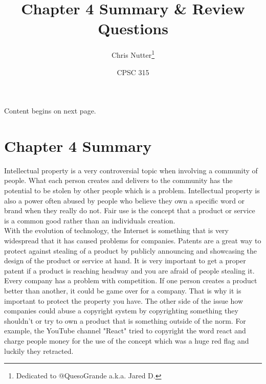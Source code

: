 \documentclass[12pt]{article}
\title{Chapter 4 Summary \& Review Questions}
\author{Chris Nutter\thanks{Dedicated to @QuesoGrande a.k.a. Jared D.}}
\date{CPSC 315}
\begin{document}
\maketitle

\normalsize

\tableofcontents    
\vspace{4ex}

\begin{center} Content begins on next page. \end{center}

\newpage
\doublespacing

\section{Chapter 4 Summary}
    \indent Intellectual property is a very controversial topic when involving a community of people. What each person creates and delivers to the community has the potential to be stolen by other people which is a problem. Intellectual property is also a power often abused by people who believe they own a specific word or brand when they really do not. Fair use is the concept that a product or service is a common good rather than an individuals creation.\\
    \indent With the evolution of technology, the Internet is something that is very widespread that it has caused problems for companies. Patents are a great way to protect against stealing of a product by publicly announcing and showcasing the design of the product or service at hand. It is very important to get a proper patent if a product is reaching headway and you are afraid of people stealing it. Every company has a problem with competition. If one person creates a product better than another, it could be game over for a company. That is why it is important to protect the property you have. The other side of the issue how companies could abuse a copyright system by copyrighting something they shouldn't or try to own a product that is something outside of the norm. For example, the YouTube channel "React" tried to copyright the word react and charge people money for the use of the concept which was a huge red flag and luckily they retracted.\\
\end{document}

